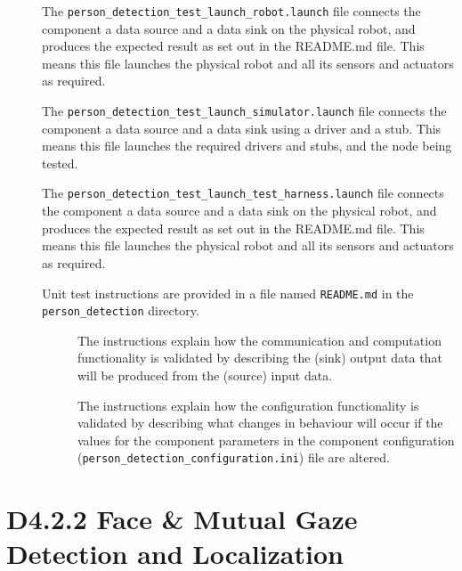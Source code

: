 \documentclass{CSSRforAfrica}
\newcommand{\checkboxChecked}{\fbox{\ding{51}}} %
\newcommand{\checkboxDashed}{\fbox{--}}         %
\begin{document}
\begin{description}
\item[\checkboxChecked] The {\small \verb+person_detection_test_launch_robot.launch+} file connects the component a data source and a data sink on the physical robot, and produces the expected result as set out in the README.md file. This means this file launches the physical robot and all its sensors and actuators as required.

\item[\checkboxDashed]   The {\small \verb+person_detection_test_launch_simulator.launch+} file connects the component a data source and a data sink using a driver and a stub. This means this file launches the required drivers and stubs, and the node being tested.

\item[\checkboxChecked]   The {\small \verb+person_detection_test_launch_test_harness.launch+} file connects the component a data source and a data sink on the physical robot, and produces the expected result as set out in the README.md file. This means this file launches the physical robot and all its sensors and actuators as required.

\item[\checkboxChecked] Unit test instructions are provided in a file named {\small \verb+README.md+} in the  {\small \verb+person_detection+} directory. 


\begin{description}

\item[\checkboxChecked] The instructions explain how the communication and computation functionality is validated by describing the (sink) output data that will be produced from the (source) input data.  

\item[\checkboxChecked] The instructions explain how the configuration functionality is validated by describing what changes in behaviour will occur if the values for the component parameters in the component configuration ({\small \verb+person_detection_configuration.ini+}) file are altered.

\end{description}

\end{description} 



\newpage

\section{D4.2.2 Face \& Mutual Gaze Detection and Localization} 
\end{document}
